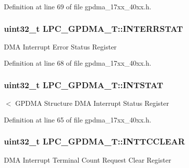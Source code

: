 Definition at line 69 of file gpdma\+\_\+17xx\+\_\+40xx.\+h.

\subsubsection[{\texorpdfstring{I\+N\+T\+E\+R\+R\+S\+T\+AT}{INTERRSTAT}}]{ uint32\+\_\+t L\+P\+C\+\_\+\+G\+P\+D\+M\+A\+\_\+\+T\+::\+I\+N\+T\+E\+R\+R\+S\+T\+AT}\hypertarget{structLPC__GPDMA__T_a6d563f8fa43b98a42090d51698735727}{}\label{structLPC__GPDMA__T_a6d563f8fa43b98a42090d51698735727}
D\+MA Interrupt Error Status Register 

Definition at line 68 of file gpdma\+\_\+17xx\+\_\+40xx.\+h.

\subsubsection[{\texorpdfstring{I\+N\+T\+S\+T\+AT}{INTSTAT}}]{ uint32\+\_\+t L\+P\+C\+\_\+\+G\+P\+D\+M\+A\+\_\+\+T\+::\+I\+N\+T\+S\+T\+AT}\hypertarget{structLPC__GPDMA__T_a744123eb8ee989a3c80570160cd0b91b}{}\label{structLPC__GPDMA__T_a744123eb8ee989a3c80570160cd0b91b}
$<$ G\+P\+D\+MA Structure D\+MA Interrupt Status Register 

Definition at line 65 of file gpdma\+\_\+17xx\+\_\+40xx.\+h.

\subsubsection[{\texorpdfstring{I\+N\+T\+T\+C\+C\+L\+E\+AR}{INTTCCLEAR}}]{ uint32\+\_\+t L\+P\+C\+\_\+\+G\+P\+D\+M\+A\+\_\+\+T\+::\+I\+N\+T\+T\+C\+C\+L\+E\+AR}\hypertarget{structLPC__GPDMA__T_a85a79ad19b52d9017a2fd7b15349a168}{}\label{structLPC__GPDMA__T_a85a79ad19b52d9017a2fd7b15349a168}
D\+MA Interrupt Terminal Count Request Clear Register 

